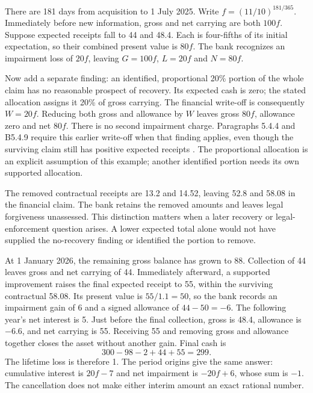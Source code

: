There are 181 days from acquisition to 1 July 2025. Write
\(f=(11/10)^{181/365}\). Immediately before new information, gross and
net carrying are both \(100f\). Suppose expected receipts fall to 44 and
48.4. Each is four-fifths of its initial expectation, so their combined
present value is \(80f\). The bank recognizes an impairment loss of
\(20f\), leaving \(G=100f\), \(L=20f\) and \(N=80f\).

Now add a separate finding: an identified, proportional 20\% portion of the
whole claim has no reasonable prospect of recovery. Its expected cash is zero;
the stated allocation assigns it 20\% of gross carrying. The financial
write-off is consequently \(W=20f\). Reducing both gross and allowance by
\(W\) leaves gross \(80f\), allowance zero and net \(80f\). There is
no second impairment charge. Paragraphs 5.4.4 and B5.4.9 require this earlier
write-off when that finding applies, even though the surviving claim still
has positive expected receipts \citep{eu20231803}. The proportional allocation
is an explicit assumption of this example; another identified portion needs
its own supported allocation.

The removed contractual receipts are 13.2 and 14.52, leaving 52.8 and 58.08
in the financial claim. The bank retains the removed amounts and leaves
legal forgiveness unassessed. This distinction matters when a later recovery
or legal-enforcement question arises. A lower expected total alone would not
have supplied the no-recovery finding or identified the portion to remove.

At 1 January 2026, the remaining gross balance has grown to 88. Collection
of 44 leaves gross and net carrying of 44. Immediately afterward, a supported
improvement raises the final expected receipt to 55, within the surviving
contractual 58.08. Its present value is \(55/1.1=50\), so the bank records
an impairment gain of 6 and a signed allowance of \(44-50=-6\).
The following year's net interest is 5. Just before the final collection,
gross is 48.4, allowance is \(-6.6\), and net carrying is 55. Receiving
55 and removing gross and allowance together closes the asset without another
gain. Final cash is
\[
 300-98-2+44+55=299.
\]
The lifetime loss is therefore 1. The period origins give the same answer:
cumulative interest is \(20f-7\) and net impairment is \(-20f+6\),
whose sum is \(-1\). The cancellation does not make either interim amount
an exact rational number.

